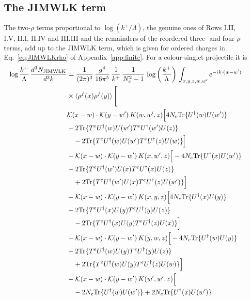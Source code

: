 \subsection{The JIMWLK term}\label{sec:JIMWLK}

The two-$\rho$ terms proportional to $\log(k^+/\Lambda)$, the genuine ones of Rows I.II, I.V, II.I, II.IV and III.III and the remainders of the reordered three- and four-$\rho$ terms, add up to the JIMWLK term, which is given for ordered charges in Eq.~\eqref{eq:JIMWLKrho} of Appendix~\ref{app:finite}. For a colour-singlet projectile it is
\begin{align}\label{eq:JIMWLKsinglet}
    \log\frac{k^+}{\Lambda}\,\frac{d^{3}N_{\rm JIMWLK}}{d^{3}k} & = \frac{1}{(2\pi)^{3}}\,\frac{g^{4}}{16\pi^{5}}\,\frac{1}{k^{+}}\,\frac{1}{N^{2}_{c}-1}\,\log{\left(\frac{k^{+}}{\Lambda}\right)}\,\int_{x,y,z,w,w'}e^{-ik\cdot(w-w')}\notag\\&\times\langle\rho^{f}(x)\rho^{f}(y) \rangle\,\Bigg[\notag \\ & \mathcal K(x-w)\cdot\mathcal K(y-w')\,K(w,w',z)\Big[4 N_{c}{\rm Tr}\{U^\dagger(w)U(w')\}\notag\\
&-2{\rm Tr}\{T^eU^\dagger(w)U(w')T^eU^\dagger(w')U(z)\}\notag\\
&\quad-2{\rm Tr}\{T^eU^\dagger(w)U(w')T^eU^\dagger(z)U(w)\}\Big]\notag\\
&+\mathcal K(x-w)\cdot\mathcal K(y-w')\,K(x,w',z)\Big[-4 N_{c}{\rm Tr}\{U^\dagger(x)U(w')\}\notag\\
&+2{\rm Tr}\{T^eU^\dagger(w')U(x)T^eU^\dagger(x)U(z)\}\notag\\
&\quad+2{\rm Tr}\{T^eU^\dagger(w')U(x)T^eU^\dagger(z)U(w')\}\Big]\notag\\
&+\mathcal K(x-w)\cdot\mathcal K(y-w')\,K(x,y,z)\Big[4 N_{c}{\rm Tr}\{U^\dagger(x)U(y)\}\notag\\
&-2{\rm Tr}\{T^eU^\dagger(x)U(y)T^eU^\dagger(y)U(z)\}\notag\\
&\quad-2{\rm Tr}\{T^eU^\dagger(x)U(y)T^eU^\dagger(z)U(x)\}\Big]\notag\\
&+\mathcal K(x-w)\cdot\mathcal K(y-w')\,K(y,w,z)\Big[-4 N_{c}{\rm Tr}\{U^\dagger(w)U(y)\}\notag\\
&+2{\rm Tr}\{T^eU^\dagger(w)U(y)T^eU^\dagger(y)U(z)\}\notag\\
&\quad+2{\rm Tr}\{T^eU^\dagger(w)U(y)T^eU^\dagger(z)U(w)\}\Big]\notag\\
&+\mathcal K(x-w)\cdot\mathcal K(y-w')\,K(w',w',z)\Big[\notag\\
&\quad-2 N_{c}{\rm Tr}\{U^\dagger(w)U(w')\}+2 N_{c}{\rm Tr}\{U^\dagger(x)U(w')\}\notag\\

\end{align}
